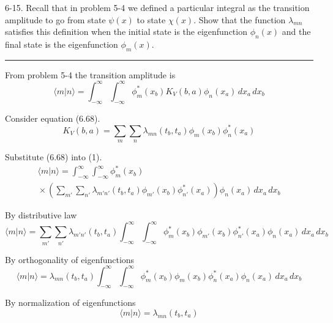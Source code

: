 \documentclass[12pt]{article}
\begin{document}
6-15.
Recall that in problem 5-4 we defined a particular integral as the
transition amplitude to go from state $\psi(x)$ to state $\chi(x)$.
Show that the function $\lambda_{mn}$ satisfies this definition
when the initial state is the eigenfunction $\phi_n(x)$ and the
final state is the eigenfunction $\phi_m(x)$.

\bigskip
\hrule

\bigskip
From problem 5-4 the transition amplitude is
\begin{equation*}
\langle m|n\rangle=
\int_{-\infty}^\infty\int_{-\infty}^\infty
\phi_m^*(x_b)K_V(b,a)\phi_n(x_a)
\,dx_a\,dx_b
\tag{1}
\end{equation*}

Consider equation (6.68).
\begin{equation*}
K_V(b,a)=\sum_m\sum_n\lambda_{mn}(t_b,t_a)\phi_m(x_b)\phi_n^*(x_a)
\tag{6.68}
\end{equation*}

Substitute (6.68) into (1).
\begin{multline*}
\langle m|n\rangle=
\int_{-\infty}^\infty\int_{-\infty}^\infty
\phi_m^*(x_b)
\\
{}\times
\left(\sum_{m'}\sum_{n'}\lambda_{m'n'}(t_b,t_a)\phi_{m'}(x_b)\phi_{n'}^*(x_a)\right)
\phi_n(x_a)
\,dx_a\,dx_b
\end{multline*}

By distributive law
\begin{equation*}
\langle m|n\rangle=
\sum_{m'}\sum_{n'}\lambda_{m'n'}(t_b,t_a)
\int_{-\infty}^\infty\int_{-\infty}^\infty
\phi_m^*(x_b)\phi_{m'}(x_b)
\phi_{n'}^*(x_a)\phi_n(x_a)
\,dx_a\,dx_b
\end{equation*}

By orthogonality of eigenfunctions
\begin{equation*}
\langle m|n\rangle=
\lambda_{mn}(t_b,t_a)\int_{-\infty}^\infty\int_{-\infty}^\infty
\phi_m^*(x_b)\phi_m(x_b)
\phi_n^*(x_a)\phi_n(x_a)
\,dx_a\,dx_b
\end{equation*}

By normalization of eigenfunctions
\begin{equation*}
\langle m|n\rangle=
\lambda_{mn}(t_b,t_a)
\end{equation*}
\end{document}
